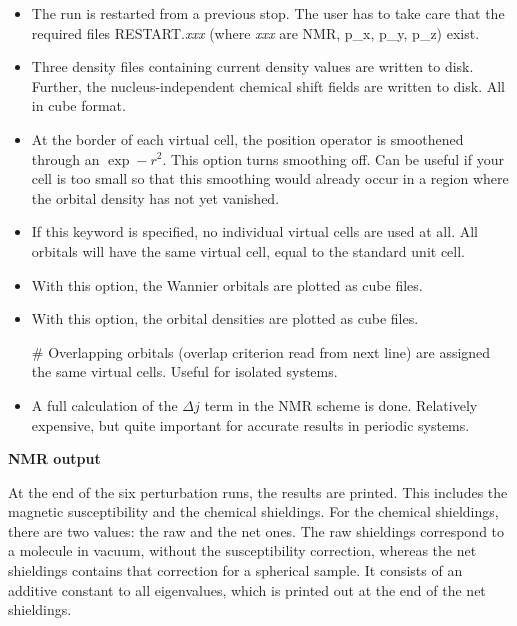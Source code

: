 \documentclass[twoside,10pt,titlepage,a4paper]{article}
\begin{document}
\begin{itemize}

\item {} The run is restarted from a previous
  stop. The user has to take care that the required files
  RESTART.\textit{xxx} (where \textit{xxx} are NMR, p\_x, p\_y, p\_z)
  exist.


\item {} Three density files containing current
  density values are written to disk. Further, the nucleus-independent
  chemical shift fields are written to disk. All in cube format.

\item {} At the border of each virtual cell, the
  position operator is smoothened through an $\exp -r^2$. This option
  turns smoothing off. Can be useful if your cell is too small so that
  this smoothing would already occur in a region where the orbital
  density has not yet vanished.


\item {} If this keyword is specified, no individual
  virtual cells are used at all. All orbitals will have the same
  virtual cell, equal to the standard unit cell.


\item {} With this option, the Wannier orbitals are
  plotted as cube files.

\item {} With this option, the orbital densities are
  plotted as cube files.

\item[\#] 
  Overlapping orbitals (overlap criterion read from next line) are
  assigned the same virtual cells. Useful for isolated systems.

\item {}
  A full calculation of the $\Delta j$ term in the NMR scheme is
  done. Relatively expensive, but quite important for accurate results
  in periodic systems.


\end{itemize}




\textbf{NMR output}

At the end of the six perturbation runs, the results are printed. This
includes the magnetic susceptibility and the chemical shieldings. For
the chemical shieldings, there are two values: the raw and the net
ones. The raw shieldings correspond to a molecule in vacuum, without
the susceptibility correction, whereas the net shieldings contains
that correction for a spherical sample. It consists of an additive
constant to all eigenvalues, which is printed out at the end of the
net shieldings.
\end{document}
